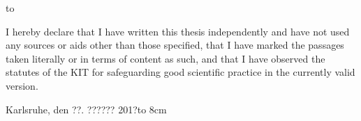 \thispagestyle{empty}
\vspace*{32\baselineskip}
\hbox to \textwidth{\hrulefill}
\par
I hereby declare that I have written this thesis independently and have not used any sources or aids other than those specified, that I have marked the passages taken literally or in terms of content as such, and that I have observed the statutes of the KIT for safeguarding good scientific practice in the currently valid version.

\vspace*{2cm}
Karlsruhe, den ??. ?????? 201?\hfill \hbox to 8cm{\hrulefill}

\clearpage






